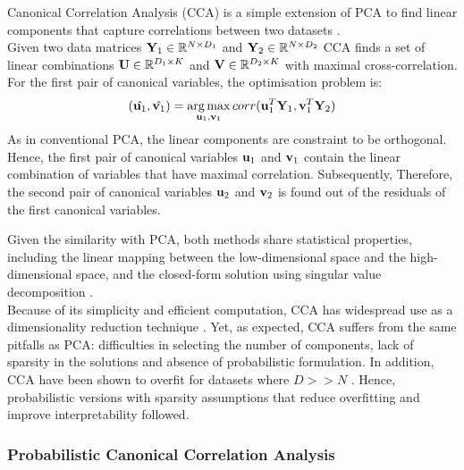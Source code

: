 Canonical Correlation Analysis (CCA) is a simple extension of PCA to find linear components that capture correlations between two datasets \cite{Hotteling1936,Hardle2007}.\\
Given two data matrices ${\bf Y}_1 \in \mathbb{R}^{N \times D_1}$ and ${\bf Y}_2 \in \mathbb{R}^{N \times D_2}$ CCA finds a set of linear combinations ${\bf U} \in \mathbb{R}^{D_1 \times K}$ and ${\bf V} \in \mathbb{R}^{D_2 \times K}$ with maximal cross-correlation.
For the first pair of canonical variables, the optimisation problem is:
\[
	(\hat{{\bf u}_1}, \hat{{\bf v}_1}) = \operatorname*{arg\,max}_{{\bf u}_1,{\bf v}_1} corr({\bf u}_{1}^T {\bf Y}_1, {\bf v}_{1}^T {\bf Y}_2)
\]
As in conventional PCA, the linear components are constraint to be orthogonal. Hence, the first pair of canonical variables ${\bf u}_1$ and ${\bf v}_1$ contain the linear combination of variables that have maximal correlation. Subsequently, Therefore, the second pair of canonical variables ${\bf u}_2$ and ${\bf v}_2$ is found out of the residuals of the first canonical variables.

Given the similarity with PCA, both methods share statistical properties, including the linear mapping between the low-dimensional space and the high-dimensional space, and the closed-form solution using singular value decomposition \cite{Hotteling1936,Hardle2007}.\\
Because of its simplicity and efficient computation, CCA has widespread use as a dimensionality reduction technique \cite{Hardle2007}. Yet, as expected, CCA suffers from the same pitfalls as PCA: difficulties in selecting the number of components, lack of sparsity in the solutions and absence of probabilistic formulation. In addition, CCA have been shown to overfit for datasets where $D>>N$ \cite{McCabe2018,Guo2016}. Hence, probabilistic versions with sparsity assumptions that reduce overfitting and improve interpretability followed.


\subsubsection{Probabilistic Canonical Correlation Analysis} \label{section_probabilisticCCA}

